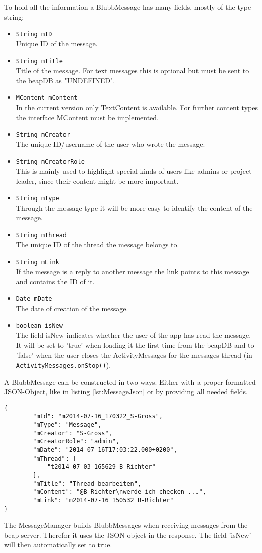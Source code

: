 \documentclass[12pt,a4paper,oneside]{report}
\newcommand{\code}[1]{\lstinline{#1}}
\begin{document}
To hold all the information a BlubbMessage has many fields, mostly of the type string: 
\begin{itemize}
\item \code{String mID}\\
Unique ID of the message.
\item \code{String mTitle}\\
Title of the message. For text messages this is optional but must be sent to the beapDB as "UNDEFINED".
\item \code{MContent mContent}\\
In the current version only TextContent is available. For further content types the interface MContent must be implemented. 
\item \code{String mCreator}\\
The unique ID/username of the user who wrote the message.
\item \code{String mCreatorRole}\\
This is mainly used to highlight special kinds of users like admins or project leader, since their content might be more important.
\item \code{String mType}\\
Through the message type it will be more easy to identify the content of the message.
\item \code{String mThread}\\
The unique ID of the thread the message belongs to.
\item \code{String mLink}\\
If the message is a reply to another message the link points to this message and contains the ID of it.
\item \code{Date mDate}\\
The date of creation of the message. 
\item \code{boolean isNew}\\
The field isNew indicates whether the user of the app has read the message. It will be set to 'true' when loading it the first time from the beapDB and to 'false' when the user closes the ActivityMessages for the messages thread (in \code{ActivityMessages.onStop()}). 

\end{itemize}

A BlubbMessage can be constructed in two ways. Either with a proper formatted JSON-Object, like in listing \ref{lst:MessageJson} or by providing all needed fields. 
\begin{lstlisting}[caption=Message JSON object, label=lst:MessageJson]
{
        "mId": "m2014-07-16_170322_S-Gross",
        "mType": "Message",
        "mCreator": "S-Gross",
        "mCreatorRole": "admin",
        "mDate": "2014-07-16T17:03:22.000+0200",
        "mThread": [
            "t2014-07-03_165629_B-Richter"
        ],
        "mTitle": "Thread bearbeiten",
        "mContent": "@B-Richter\nwerde ich checken ...",
        "mLink": "m2014-07-16_150532_B-Richter"
}

\end{lstlisting}
The MessageManager builds BlubbMessages when receiving messages from the beap server. Therefor it uses the JSON object in the response. The field 'isNew' will then automatically set to true.
\end{document}

